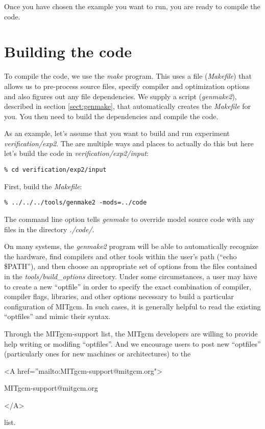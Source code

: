 Once you have chosen the example you want to run, you are ready to
compile the code.

\section{Building the code}
\label{sect:buildingCode}

To compile the code, we use the {\em make} program. This uses a file
({\em Makefile}) that allows us to pre-process source files, specify
compiler and optimization options and also figures out any file
dependencies. We supply a script ({\em genmake2}), described in
section \ref{sect:genmake}, that automatically creates the {\em
  Makefile} for you. You then need to build the dependencies and
compile the code.

As an example, let's assume that you want to build and run experiment
\textit{verification/exp2}. The are multiple ways and places to
actually do this but here let's build the code in
\textit{verification/exp2/input}:
\begin{verbatim}
% cd verification/exp2/input
\end{verbatim}
First, build the {\em Makefile}:
\begin{verbatim}
% ../../../tools/genmake2 -mods=../code
\end{verbatim}
The command line option tells {\em genmake} to override model source
code with any files in the directory {\em ./code/}.

On many systems, the {\em genmake2} program will be able to
automatically recognize the hardware, find compilers and other tools
within the user's path (``echo \$PATH''), and then choose an
appropriate set of options from the files contained in the {\em
  tools/build\_options} directory.  Under some circumstances, a user
may have to create a new ``optfile'' in order to specify the exact
combination of compiler, compiler flags, libraries, and other options
necessary to build a particular configuration of MITgcm.  In such
cases, it is generally helpful to read the existing ``optfiles'' and
mimic their syntax.

Through the MITgcm-support list, the MITgcm developers are willing to
provide help writing or modifing ``optfiles''.  And we encourage users
to post new ``optfiles'' (particularly ones for new machines or
architectures) to the 
\begin{rawhtml} <A href=''mailto:MITgcm-support@mitgcm.org"> \end{rawhtml}
MITgcm-support@mitgcm.org
\begin{rawhtml} </A> \end{rawhtml}
list.


